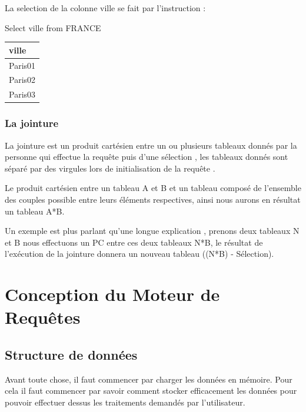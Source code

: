 \documentclass[oneside,13pt,a4paper]{report}
\begin{document}
         La selection de la colonne ville se fait par l'instruction :

         Select ville from FRANCE

         

         \begin{tabular}{|l|}
          \hline
          ville
          \\
          \hline
          Paris01 \\
          Paris02 \\
          Paris03  \\
          \hline


         \end{tabular}
        \subsection{La jointure}

            La jointure est un produit cartésien entre un ou plusieurs tableaux donnés par la personne qui effectue la requête puis d'une sélection , les tableaux donnés sont séparé par des virgules lors de initialisation de la requête .

            Le produit cartésien entre un tableau A et B et un tableau composé de l'ensemble des couples possible entre leurs éléments respectives, ainsi nous aurons en résultat un tableau A*B.

	          Un exemple est plus parlant qu'une longue explication , prenons deux tableaux N et B nous effectuons un PC entre ces deux tableaux N*B, le résultat de l’exécution de la jointure donnera un nouveau tableau ((N*B) - Sélection).


    \chapter{Conception du Moteur de Requêtes}

        \section{Structure de données}
            Avant toute chose, il faut commencer par charger les données en mémoire. Pour cela il faut commencer par savoir comment stocker efficacement les données pour pouvoir effectuer dessus les traitements demandés par l’utilisateur.
\end{document}
